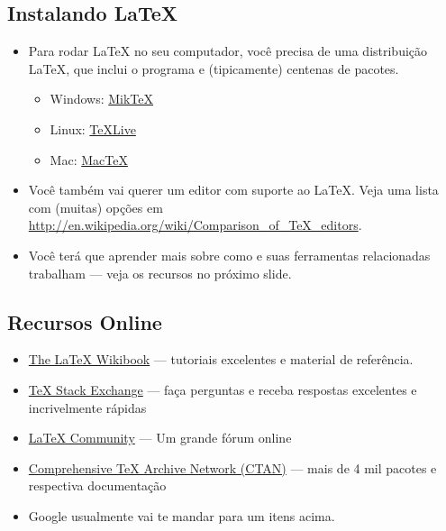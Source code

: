 \documentclass{beamer}
\begin{document}
\subsection{Instalando \LaTeX{}}
\begin{frame}{\insertsubsection}
	\begin{itemize}
		\item Para rodar \LaTeX{} no seu computador, você precisa de uma distribuição \LaTeX{}, que inclui o programa  e (tipicamente) centenas de pacotes.
			\begin{itemize}
				\item Windows: \href{http://miktex.org/}{Mik\TeX}
				\item Linux: \href{http://tug.org/texlive/}{\TeX Live}
				\item Mac: \href{http://tug.org/mactex/}{Mac\TeX}
			\end{itemize} 
		\item Você também vai querer um editor com suporte ao \LaTeX{}. Veja uma lista com (muitas) opções em {\scriptsize \url{http://en.wikipedia.org/wiki/Comparison_of_TeX_editors}}.
		\item Você terá que aprender mais sobre como  e suas ferramentas relacionadas trabalham --- veja os recursos no próximo slide.
	\end{itemize}
\end{frame}

\subsection{Recursos Online}
\begin{frame}{\insertsubsection}
	\begin{itemize}
		\item \href{http://en.wikibooks.org/wiki/LaTeX}{The \LaTeX{} Wikibook} ---
		tutoriais excelentes e material de referência.
		\item \href{http://tex.stackexchange.com/}{\TeX{} Stack Exchange} --- faça perguntas e receba respostas excelentes e incrivelmente rápidas
		\item \href{http://www.latex-community.org/}{\LaTeX{} Community} --- Um grande fórum 
		online
		\item \href{http://ctan.org/}{Comprehensive \TeX{} Archive Network (CTAN)} ---
		mais de 4 mil pacotes e respectiva documentação
		\item Google usualmente vai te mandar para um itens acima.
	\end{itemize}
\end{frame}
\end{document}
